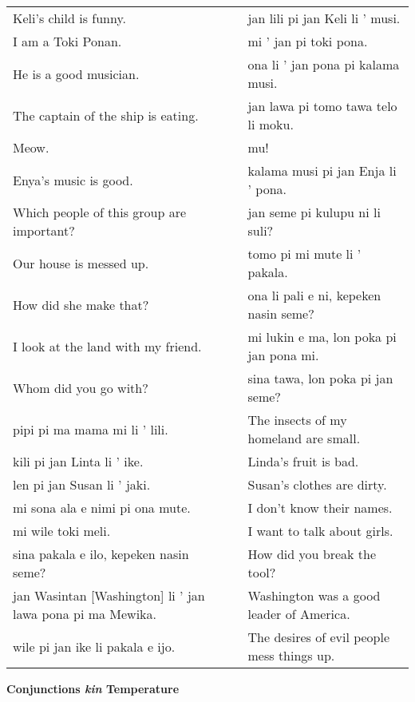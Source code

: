 \begin{supertabular}{p{5,5cm}|ll}
Keli's child is funny.  && jan lili pi jan Keli li ' musi. \\ %
I am a Toki Ponan.  && mi ' jan pi toki pona. \\ %
He is a good musician.  && ona li ' jan pona pi kalama musi. \\ %
The captain of the ship is eating.  && jan lawa pi tomo tawa telo li moku. \\ %
Meow.  && mu! \\ %
Enya's music is good.  && kalama musi pi jan Enja li ' pona. \\ %
Which people of this group are important?  && jan seme pi kulupu ni li suli? \\ %
Our house is messed up.  && tomo pi mi mute li ' pakala. \\ %
How did she make that?  && ona li pali e ni, kepeken nasin seme? \\ %
I look at the land with my friend.  && mi lukin e ma, lon poka pi jan pona mi. \\ %
Whom did you go with?  && sina tawa, lon poka pi jan seme? \\ %
pipi pi ma mama mi li ' lili. && The insects of my homeland are small. \\
kili pi jan Linta li ' ike.  && Linda's fruit is bad. \\
len pi jan Susan li ' jaki.  && Susan's clothes are dirty. \\
mi sona ala e nimi pi ona mute.  && I don't know their names. \\
mi wile toki meli.  && I want to talk about girls. \\
sina pakala e ilo, kepeken nasin seme?  && How did you break the tool? \\
jan Wasintan [Washington] li ' jan lawa pona pi ma Mewika.  && Washington was a good leader of America. \\
wile pi jan ike li pakala e ijo.  && The desires of evil people mess things up. \\
\end{supertabular}  

\textbf{Conjunctions \textit{kin} Temperature} 
\label{'conjunctions_temperature'}

